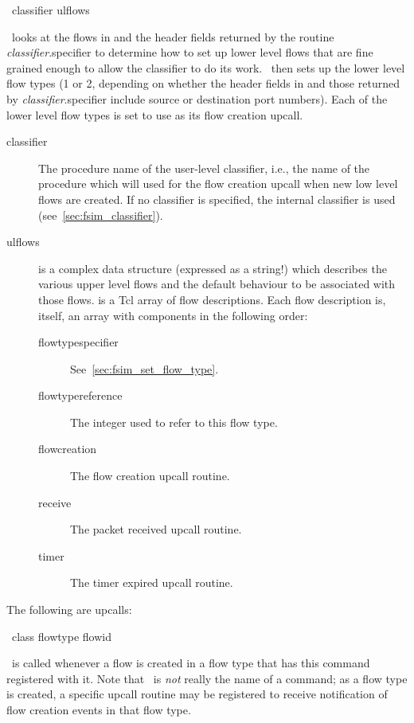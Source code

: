 \documentclass{article}
\begin{document}
\SYNOPSIS \cmdname\ classifier ulflows

\DESCRIPTION

\cmdname\ looks at the flows in  and the header fields
returned by the routine \emph{classifier}.specifier
to determine how to set up lower level flows
that are fine grained enough to allow the classifier to do its work.
\cmdname\ then sets up the lower level flow types (1 or 2, depending on
whether the header fields in  and
those returned by \emph{classifier}.specifier
include source or destination port numbers).
Each of the lower level flow types is set to use  as
its flow creation upcall.

\begin{description}
\item[classifier] The procedure name of the user-level classifier,
i.e., the name of the procedure which will used for the flow creation
upcall when new low level flows are created.  If no classifier is
specified, the internal classifier  is used
(see~\ref{sec:fsim_classifier}).
\item[ulflows]   is a complex data structure (expressed
as a string!) which describes the various upper level flows and the
default behaviour to be associated with those flows.  
is a Tcl array of flow descriptions.  Each flow description is, itself,
an array with components in the following order:
\begin{description}
\item[flowtypespecifier] See~\ref{sec:fsim_set_flow_type}.
\item[flowtypereference] The integer used to refer to this flow type.
\item[flowcreation] The flow creation upcall routine.
\item[receive] The packet received upcall routine.
\item[timer] The timer expired upcall routine.
\end{description}
\end{description}

\manend

The following are upcalls:

\label{sec:upcall_flow_creation}

\SYNOPSIS \cmdname\ class flowtype flowid

\DESCRIPTION

\cmdname\ is called whenever a flow is created in a flow type that has
this command registered with it.  Note that \cmdname\ is \emph{not}
really the name of a command; as a flow type is created, a specific upcall
routine may be registered to receive notification of flow creation
events in that flow type.
\end{document}
